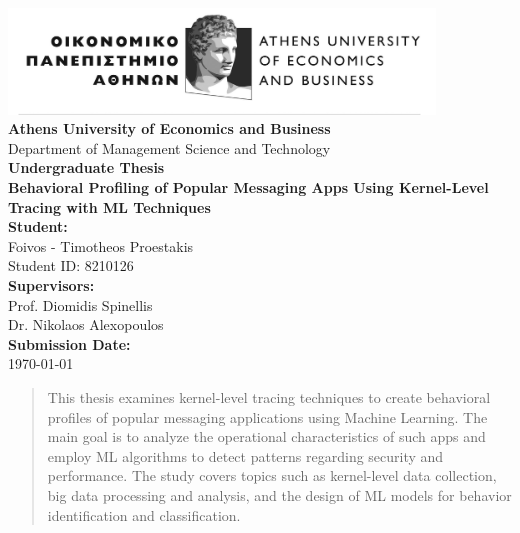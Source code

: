 \documentclass[a4paper,12pt]{report}
\begin{document}
\begin{titlepage}
    \begin{center}
        \vspace*{1.5cm}

        \includegraphics[width=0.85\textwidth]{./aueb_logo.png}\\[1cm]

        {\Large \textbf{Athens University of Economics and Business}}\\[0.5cm]
        {\large Department of Management Science and Technology}\\[1.5cm]

        {\Huge \textbf{Undergraduate Thesis}}\\[1.2cm]
        {\Large \textbf{Behavioral Profiling of Popular Messaging Apps Using Kernel-Level Tracing with ML Techniques}}\\[2cm]

        \textbf{Student:}\\
        Foivos - Timotheos Proestakis\\
        Student ID: 8210126\\[1.5cm]

        \textbf{Supervisors:}\\
        Prof. Diomidis Spinellis \\
        Dr. Nikolaos Alexopoulos\\[1.5cm]

        \vfill
        \textbf{Submission Date:}\\
        \today
        \vspace*{1cm}
    \end{center}
\end{titlepage}
\clearpage


\begin{abstract}
This thesis examines kernel-level tracing techniques to create behavioral profiles of popular messaging applications using Machine Learning. The main goal is to analyze the operational characteristics of such apps and employ ML algorithms to detect patterns regarding security and performance. The study covers topics such as kernel-level data collection, big data processing and analysis, and the design of ML models for behavior identification and classification.
\end{abstract}
\clearpage
\end{document}
